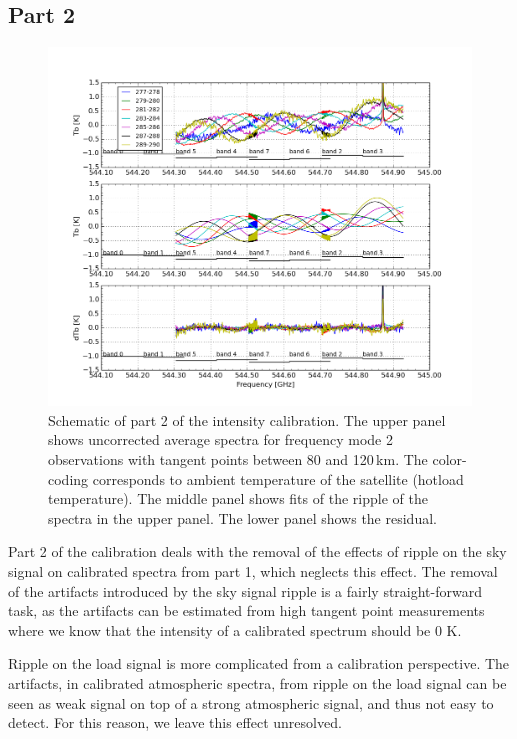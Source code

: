 \subsection*{Part 2}

\begin{figure}[t]
\includegraphics[width=14cm]{calibration_step2_fig.png}
\caption{Schematic of part 2 of the intensity calibration.
The upper panel shows uncorrected average spectra for frequency mode 2 observations
with tangent points between 80 and 120\,km. The color-coding corresponds
to ambient temperature of the satellite (hotload temperature).
The middle panel shows fits of the ripple of the spectra in the 
upper panel. The lower panel shows the residual.}
\label{fig:ripple1}
\end{figure}



Part 2 of the calibration deals with the removal
of the effects of ripple on the sky signal on calibrated
spectra from part 1, which neglects this effect.
The removal of the artifacts introduced by the sky signal
ripple is a fairly straight-forward task, as the artifacts
can be estimated from high tangent point measurements
where we know that the intensity of a calibrated spectrum should be 0 K.

Ripple on the load signal is more complicated from
a calibration perspective. The artifacts, in calibrated
atmospheric spectra, from ripple on the
load signal can be seen as weak signal on top of a strong
atmospheric signal, and thus not easy to detect.
For this reason, we leave this effect unresolved.

